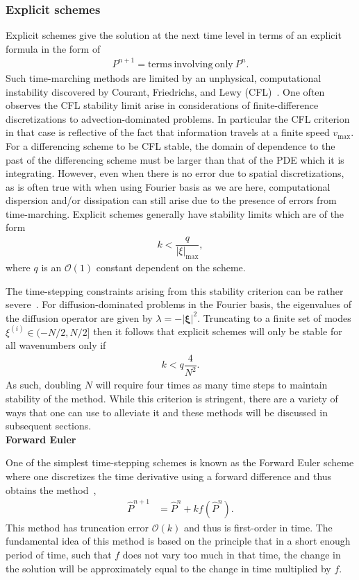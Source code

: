 \documentclass[11pt]{article}
\newcommand{\Phat}{\hat{P}}
\begin{document}
\subsubsection{Explicit schemes}
Explicit schemes give the solution at the next time level in terms of an explicit formula in the form of
\begin{align}
    P^{n+1} = \mathrm{terms\ involving\ only\ }P^{n}.
\end{align}
Such time-marching methods are limited by an unphysical, computational instability discovered by Courant, Friedrichs, and Lewy (CFL)~\cite{leveque2007finite}. One often observes the CFL stability limit arise in considerations of finite-difference discretizations to advection-dominated problems. In particular the CFL criterion in that case is reflective of the fact that information travels at a finite speed $v_{\mathrm{max}}$. For a differencing scheme to be CFL stable, the domain of dependence to the past of the differencing scheme must be larger than that of the PDE which it is integrating. However, even when there is no error due to spatial discretizations, as is often true with when using Fourier basis as we are here, computational dispersion and/or dissipation can still arise due to the presence of errors from time-marching. Explicit schemes generally have stability limits which are of the form 
\begin{align}
    k < \dfrac{q}{|\xi|_{\mathrm{max}}},
\end{align} 
where $q$ is an $\mathcal{O}(1)$ constant dependent on the scheme. 

The time-stepping constraints arising from this stability criterion can be rather severe~\cite{trefethen2000spectral}. For diffusion-dominated problems in the Fourier basis, the eigenvalues of the diffusion operator are given by $\lambda = -|\bm{\xi}|^{2}$. Truncating to a finite set of modes $\xi^{(i)}\in(-N/2,N/2]$ then it follows that explicit schemes will only be stable for all wavenumbers only if
\begin{align}
    k < q\dfrac{4}{N^{2}}.
\end{align} 
As such, doubling $N$ will require four times as many time steps to maintain stability of the method. While this criterion is stringent, there are a variety of ways that one can use to alleviate it and these methods will be discussed in subsequent sections. \\

\noindent\textbf{Forward Euler}

One of the simplest time-stepping schemes is known as the Forward Euler scheme where one discretizes the time derivative using a forward difference and thus obtains the method~\cite{numerical_recipes}, 
\begin{align}
    \Phat^{n+1} &= \Phat^{n} + kf(\Phat^{n}).\label{eq:fwd_euler}
\end{align}
This method has truncation error $\mathcal{O}(k)$ and thus is first-order in time. The fundamental idea of this method is based on the principle that in a short enough period of time, such that $f$ does not vary too much in that time, the change in the solution will be approximately equal to the change in time multiplied by $f$. \\
\end{document}
